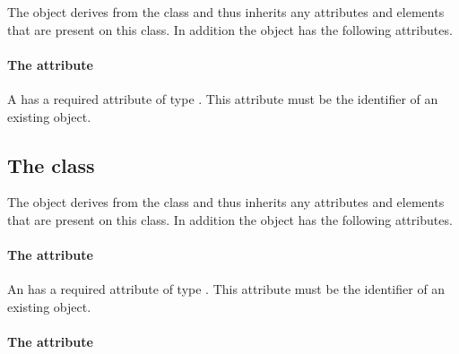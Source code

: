 
The \SpatialSymbolReference object derives from the \SBase class and
thus inherits any attributes and elements that are present on this
class.
In addition the \SpatialSymbolReference object has the following
attributes.

\paragraph{The \fixttspace{} attribute}

A \SpatialSymbolReference has a required attribute  of
type .
This attribute must be the identifier of an existing \Geometry object.


\subsection{The  class}
\label{advectioncoefficient-class}




The \AdvectionCoefficient object derives from the \SBase class and thus
inherits any attributes and elements that are present on this class.
In addition the \AdvectionCoefficient object has the following
attributes.

\paragraph{The \fixttspace{} attribute}

An \AdvectionCoefficient has a required attribute  of
type .
This attribute must be the identifier of an existing \Species object.


\paragraph{The \fixttspace{} attribute}

